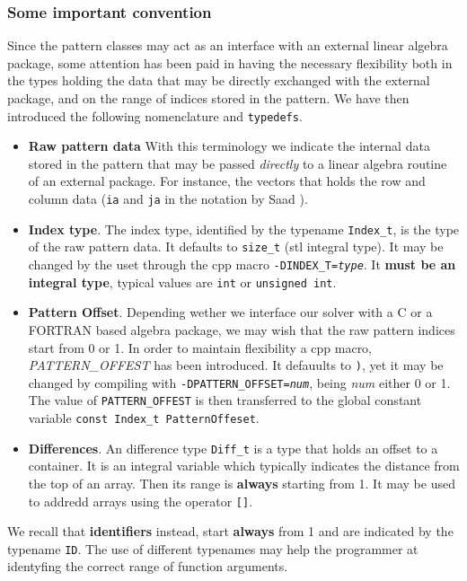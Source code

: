 \subsubsection{Some important convention}
\label{sec:some-import-conv}

Since the pattern classes may act as an interface with an external
linear algebra package, some attention has been paid in having the
necessary flexibility both in the types holding the data that may be
directly exchanged with the external package, and on the range of
indices stored in the pattern.
We have then introduced the following nomenclature and \texttt{typedefs}.
\begin{itemize}
\item \textbf{Raw pattern data} With this terminology we indicate the
  internal data stored in the pattern that may be passed \emph{directly} 
  to a linear algebra routine of an external package. For instance, the
  vectors that holds the row and column data (\texttt{ia} and
  \texttt{ja} in the notation by Saad \cite{Saad:1992:NML}).
\item \textbf{Index type}. The index type, identified by the typename
  \texttt{Index\_t}, is the type of the raw pattern data. It defaults to
  \texttt{size\_t} (stl integral type). It may be changed by the uset
  through the cpp macro \texttt{-DINDEX\_T=\emph{type}}. It \textbf{must be an
  integral type}, typical values are \texttt{int} or \texttt{unsigned int}.
\item\textbf{Pattern Offset}. Depending wether we interface our solver
  with a C or a FORTRAN based algebra package, we may wish that the
  raw pattern indices start from 0 or 1. In order to maintain
  flexibility a cpp macro, \textit{PATTERN\_OFFEST} has been
  introduced. It defauults to \texttt{)}, yet it may be changed by
  compiling with \texttt{-DPATTERN\_OFFSET=\emph{num}}, being \emph{num}
  either 0 or 1. The value of \texttt{PATTERN\_OFFEST} is then
  transferred to the global constant variable \texttt{const Index\_t
    PatternOffeset}.
\item \textbf{Differences}. An difference type \texttt{Diff\_t} is a type 
  that holds an offset to a container. It is  an integral variable
  which typically indicates the distance from the top of an array. Then
  its range is \textbf{always} starting from 1. It may be used to
  addredd arrays using the operator \texttt{[]}.
\end{itemize}
We recall that \textbf{identifiers} instead, start \textbf{always} from
1 and are indicated by the typename \texttt{ID}. 
The use of different typenames may help the programmer at identyfing the 
correct range of function arguments.
